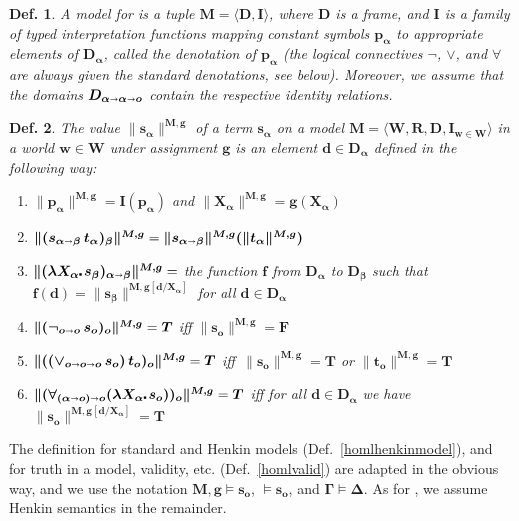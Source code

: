 \documentclass{ecai2014}
\newtheorem{definition}{Def.}
\def\lambdot{\rule{0.6mm}{0.6mm}\hspace{0.4ex}}
\def\lam#1{\lambda #1\lambdot}
\newcommand\entity[1]{\text{\textrm{#1}}}
\def\HOML{\entity{HOML}\xspace}
\def\HOL{\entity{HOL}\xspace}
\def\ar{\shortrightarrow}
\newcommand\hol[1]{\boldsymbol{#1}}
\begin{document}
\begin{definition}\label{holmodel}
  A \emph{model} for \HOL is a tuple $\hol{M}=\hol{\langle D, I \rangle}$, where
  $\hol{D}$ is a frame, and $\hol{I}$ is a family of typed interpretation
  functions mapping constant symbols $\hol{p_\alpha}$ to appropriate
  elements of $\hol{D_\alpha}$, called the \emph{denotation of $\hol{p_\alpha}$}
  (the logical connectives $\hol{\neg}$, $\hol{\vee}$, and $\hol{\forall}$ are always
  given the standard denotations, see below).  Moreover, we assume that the domains
  $\hol{D_{\alpha\ar\alpha\ar o}}$ contain the respective identity relations.
\end{definition}


\begin{definition}\label{holvalue}
  The \emph{value} $\hol{\| s_\alpha\|^{M,g}}$ of a \HOML term
  $\hol{s_\alpha}$ on a model $\hol{M}=\hol{\langle W, R, D, I_{w\in
      W} \rangle}$ in a world $\hol{w}\in \hol{W}$ under assignment $\hol{g}$ is an element $\hol{d}\in \hol{D_\alpha}$
  defined in the following way:
\begin{enumerate}
\item $\hol{\|p_\alpha\|^{M,g}} = \hol{I(p_\alpha)}$ and $\hol{\|X_\alpha\|^{M,g}} = \hol{g(X_\alpha)}$
\item $\hol{\|(s_{\alpha\ar\beta}\, t_\alpha)_\beta\|^{M,g}} = \hol{\|s_{\alpha\ar\beta}\|^{M,g}(\|t_\alpha\|^{M,g})}$
\item $\hol{\|(\lam{X_\alpha}s_\beta)_{\alpha\ar\beta}\|^{M,g}} = $
  the function $\hol{f}$ from $\hol{D_\alpha}$ to $\hol{D_\beta}$ such
  that $\hol{f(d)} = \hol{\|s_\beta\|^{M,g[d/X_\alpha]}}$ for all
  $\hol{d}\in \hol{D_\alpha}$
\item $\hol{\|(\neg_{o\ar o}\, s_o)_o\|^{M,g}} = \hol{T}$ iff $\hol{\|s_o\|^{M,g}} = \hol{F}$
\item $\hol{\|(({\vee_{o\ar o\ar o}}\,s_o)\,t_o)_o\|^{M,g}} =
  \hol{T}$ iff\, $\hol{\|s_o\|^{M,g}} = \hol{T}$ or $\hol{\|t_o\|^{M,g}}
  = \hol{T}$
\item $\hol{\|(\forall_{(\alpha\ar o)\ar o}(\lam{X_\alpha}
    s_o))_o\|^{M,g}} = \hol{T}$ iff for all $\hol{d}\in
  \hol{D_\alpha}$ we have $\hol{\|s_o\|^{M,g[d/X_\alpha]}} = \hol{T}$
\end{enumerate}
\end{definition}


The definition for standard and Henkin models
(Def.~\ref{homlhenkinmodel}), and for truth in a model, validity,
etc. (Def.~\ref{homlvalid}) are adapted in the obvious way, and we use
the notation $\hol{M,g \models s_o}$, $\hol{\models s_o}$, and
$\hol{\Gamma \models \Delta}$. As for \HOML, we assume Henkin
semantics in the remainder.
\end{document}

